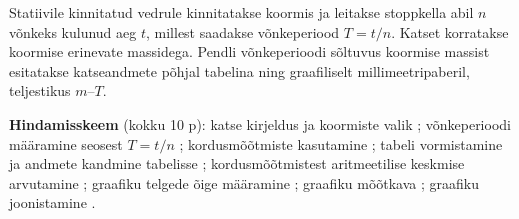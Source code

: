 Statiivile kinnitatud vedrule kinnitatakse koormis ja leitakse stoppkella
abil $n$ võnkeks kulunud aeg $t$, millest saadakse võnkeperiood
$T = t/n$. Katset korratakse koormise erinevate massidega. Pendli
võnkeperioodi sõltuvus koormise massist esitatakse katseandmete põhjal
tabelina ning graafiliselt millimeetripaberil, teljestikus $m$--$T$.

\textbf{Hindamisskeem} (kokku 10 p): katse kirjeldus ja koormiste valik
; võnkeperioodi määramine seosest $T = t/n$ ;
kordusmõõtmiste kasutamine ; tabeli vormistamine ja andmete kandmine
tabelisse ; kordusmõõtmistest aritmeetilise keskmise arvutamine
; graafiku telgede õige määramine ; graafiku mõõtkava ;
graafiku joonistamine .
